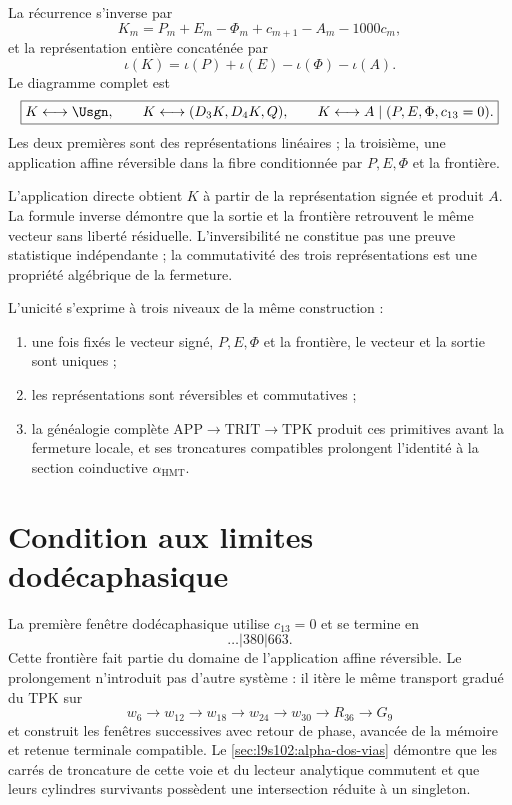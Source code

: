 La récurrence s'inverse par
\[
K_m=P_m+E_m-\Phi_m+c_{m+1}-A_m-1000c_m,
\]
et la représentation entière concaténée par
\[
\iota(K)=\iota(P)+\iota(E)-\iota(\Phi)-\iota(A).
\]
Le diagramme complet est
\[
\boxed{
K\longleftrightarrow\Usgn,
\qquad
K\longleftrightarrow(D_3K,D_4K,Q),
\qquad
K\longleftrightarrow A\mid(P,E,\Phi,c_{13}=0).}
\]
Les deux premières sont des représentations linéaires ; la troisième, une application
affine réversible dans la fibre
conditionnée par \(P,E,\Phi\) et la frontière.

\begin{remark}
L'application directe obtient \(K\) à partir de la représentation signée et produit
\(A\). La formule inverse démontre que la sortie et la frontière retrouvent le
même vecteur sans liberté résiduelle. L'inversibilité ne constitue pas une
preuve statistique indépendante ; la commutativité des trois
représentations est une propriété algébrique de la fermeture.
\end{remark}

L'unicité s'exprime à trois niveaux de la même construction :
\begin{enumerate}
  \item une fois fixés le vecteur signé, \(P,E,\Phi\) et la frontière, le vecteur et la
  sortie sont uniques ;
  \item les représentations sont réversibles et commutatives ;
  \item la généalogie complète
  \(\mathrm{APP}\to\mathrm{TRIT}\to\mathrm{TPK}\) produit ces primitives
  avant la fermeture locale, et ses troncatures compatibles prolongent
  l'identité à la section coinductive \(\alpha_{\mathrm{HMT}}\).
\end{enumerate}

\section{Condition aux limites dodécaphasique}

La première fenêtre dodécaphasique utilise \(c_{13}=0\) et se termine en
\[
\ldots|380|663.
\]
Cette frontière fait partie du domaine de l'application affine réversible. Le
prolongement n'introduit pas d'autre système : il itère le même transport gradué
du TPK sur
\[
 w_6\to w_{12}\to w_{18}\to w_{24}\to w_{30}\to R_{36}\to G_9
\]
et construit les fenêtres successives avec retour de phase, avancée de la mémoire et
retenue terminale compatible. Le
\cref{sec:l9s102:alpha-dos-vias} démontre que les carrés de troncature
de cette voie et du lecteur analytique commutent et que leurs cylindres
survivants possèdent une intersection réduite à un singleton.

